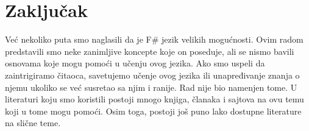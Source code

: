 \documentclass[a4paper]{article}
\begin{document}
\section{Zaključak}
\label{sec:zakljucak}

Već nekoliko puta smo naglasili da je F\# jezik velikih mogućnosti. Ovim radom predstavili smo neke zanimljive koncepte koje on poseduje, ali se nismo bavili osnovama koje mogu pomoći u učenju ovog jezika. Ako smo uspeli da zaintrigiramo čitaoca, savetujemo učenje ovog jezika ili unapređivanje znanja o njemu ukoliko se već susretao sa njim i ranije. Rad nije bio namenjen tome. U literaturi koju smo koristili postoji mnogo knjiga, članaka i sajtova na ovu temu koji u tome mogu pomoći. Osim toga, postoji još puno lako dostupne literature na slične teme.

\appendix
 

\end{document}
